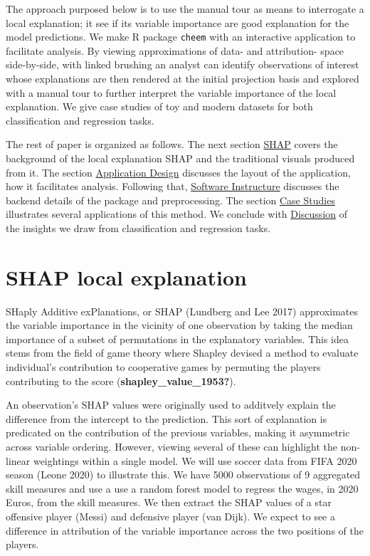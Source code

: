 \documentclass[
]{article}
\begin{document}
The approach purposed below is to use the manual tour as means to interrogate a local explanation; it see if its variable importance are good explanation for the model predictions. We make R package \texttt{cheem} with an interactive application to facilitate analysis. By viewing approximations of data- and attribution- space side-by-side, with linked brushing an analyst can identify observations of interest whose explanations are then rendered at the initial projection basis and explored with a manual tour to further interpret the variable importance of the local explanation. We give case studies of toy and modern datasets for both classification and regression tasks.

The rest of paper is organized as follows. The next section \protect\hyperlink{sec:SHAP}{SHAP} covers the background of the local explanation SHAP and the traditional visuals produced from it. The section \protect\hyperlink{sec:applicationdesign}{Application Design} discusses the layout of the application, how it facilitates analysis. Following that, \protect\hyperlink{sec:softwareinfrastructure}{Software Instructure} discusses the backend details of the package and preprocessing. The section \protect\hyperlink{sec:casestudies}{Case Studies} illustrates several applications of this method. We conclude with \protect\hyperlink{sec:discussion}{Discussion} of the insights we draw from classification and regression tasks.

\hypertarget{sec:SHAP}{%
\section{SHAP local explanation}\label{sec:SHAP}}

SHaply Additive exPlanations, or SHAP (Lundberg and Lee 2017) approximates the variable importance in the vicinity of one observation by taking the median importance of a subset of permutations in the explanatory variables. This idea stems from the field of game theory where Shapley devised a method to evaluate individual's contribution to cooperative games by permuting the players contributing to the score (\textbf{shapley\_value\_1953?}).

An observation's SHAP values were originally used to additvely explain the difference from the intercept to the prediction. This sort of explanation is predicated on the contribution of the previous variables, making it asymmetric across variable ordering. However, viewing several of these can highlight the non-linear weightings within a single model. We will use soccer data from FIFA 2020 season (Leone 2020) to illustrate this. We have 5000 observations of 9 aggregated skill measures and use a use a random forest model to regress the wages, in 2020 Euros, from the skill measures. We then extract the SHAP values of a star offensive player (Messi) and defensive player (van Dijk). We expect to see a difference in attribution of the variable importance across the two positions of the players.
\end{document}
